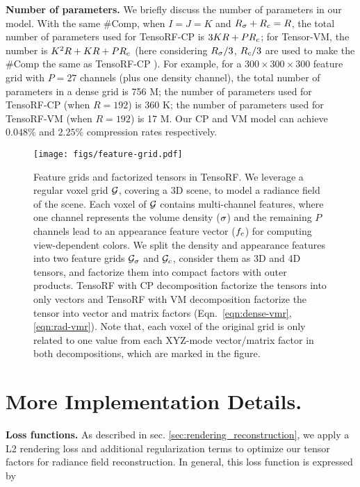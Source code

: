 \documentclass[runningheads]{llncs}
\newcommand{\boldstartspace}[1]{\vspace{0.1in}\noindent\textbf{#1}}
\begin{document}
\boldstartspace{Number of parameters.}
We briefly discuss the number of parameters in our model.
With the same $\#$Comp, when $I=J=K$ and $R_\sigma+R_c=R$, the total number of parameters used for TensoRF-CP is $3KR+PR_c$; for Tensor-VM, the number is $K^2R+KR+PR_c$ (here considering $R_\sigma/3$, $R_c/3$ are used to make the $\#$Comp the same as TensoRF-CP ). For example, for a $300\times300\times300$ feature grid with $P=27$ channels (plus one density channel), the total number of parameters in a dense grid is 756 M; the number of parameters used for TensoRF-CP (when $R=192$) is 360 K; the number of parameters used for TensoRF-VM (when $R=192$) is 17 M.
Our CP and VM model can achieve $0.048\%$ and $2.25\%$ compression rates respectively.










\begin{figure}[t]
    \centering
    \texttt{[image: figs/feature-grid.pdf]}
\caption{Feature grids and factorized tensors in TensoRF. We leverage a regular voxel grid $\mathcal{G}$, covering a 3D scene, to model a radiance field of the scene. Each voxel of $\mathcal{G}$ contains multi-channel features, where one channel represents the volume density ($\sigma$) and the remaining $P$ channels lead to  an appearance feature vector ($f_c$) for computing view-dependent colors. We split the density and appearance features into two feature grids $\mathcal{G}_\sigma$ and $\mathcal{G}_c$, consider them as 3D and 4D tensors, and factorize them into compact factors with outer products. TensoRF with CP decomposition factorize the tensors into only vectors and TensoRF with VM decomposition factorize the tensor into vector and matrix factors (Eqn.~\ref{eqn:dense-vmr}, \ref{eqn:rad-vmr}). Note that, each voxel of the original grid is only related to one value from each XYZ-mode vector/matrix factor in both decompositions, which are marked in the figure.}
    \label{fig:grids}
\end{figure}

\section{More Implementation Details.}

\boldstartspace{Loss functions.}
As described in sec. \ref{sec:rendering_reconstruction}, we apply a L2 rendering loss and additional regularization terms to optimize our tensor factors for radiance field reconstruction.
In general, this loss function is expressed by
\end{document}
